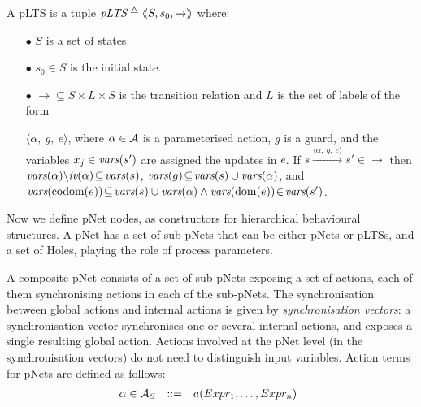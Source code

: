 \documentclass{llncs}
\newcommand{\Ludo}{\\\hfill\mdash Ludo}
\newcommand{\noteLH}[2][color=blue!40, size=\tiny]{\todo[#1]{{#2}\Ludo}}
\newcommand{\mdash}[1][]{---#1}
\begin{document}
\begin{definition}[pLTS]
\label{pLTS}
A pLTS is a tuple
$\pLTS\triangleq\mylangle S,s_0, \to\myrangle$ where:
\begin{itemize}
\item[$\bullet$]
$S$ is a set of states.
\item[$\bullet$]
$s_0 \in S$ is the initial state.
\item[$\bullet$] $\to \subseteq S \times L \times S$ is the transition relation and 
$L$ is the set of labels of the form

$\langle \alpha,~g,~e\rangle$,
where $\alpha \in\mathcal{A}$ is a parameterised action, $g$ is a guard, and the variables 
$x_j\in \vars(s')$
are assigned the updates in $e$.
If 
$s \xrightarrow{\langle \alpha,~g,~e\rangle} s'\in \to $ then 
		$\vars(\alpha)\backslash \iv(\alpha)\!\subseteq\! \vars(s)$, 
		$\vars(g)\!\subseteq\! \vars(s)\cup\vars(\alpha)$, and
		$\vars(\codom(e))\!\subseteq\! \vars(s)\cup\vars(\alpha)\land 
		\vars(\dom(e))\!\in\!\vars(s')$. %
		
\end{itemize}
\end{definition}
\noteLH{is dom and codom clear?}
Now we define
pNet nodes, as constructors for hierarchical behavioural structures.
A pNet has a set of sub-pNets that can be either pNets or pLTSs, and a
set of Holes, playing the role of process parameters.

A composite pNet consists of a set of sub-pNets exposing
a set of actions, each of them synchronising actions in each of
the sub-pNets. The synchronisation between global actions and
internal actions is given by  \emph{synchronisation vectors}: a
synchronisation vector synchronises one or several internal actions, and
exposes a single resulting global action.
Actions involved at the pNet level (in the synchronisation vectors) do
not need to distinguish  input 
variables. Action terms for pNets are defined as follows:
\[\begin{array}[l]{rcl@{\quad}l}
  \alpha\in \AlgAS &::=&a(Expr_1,\ldots,Expr_n)
\end{array}
\]
\end{document}
